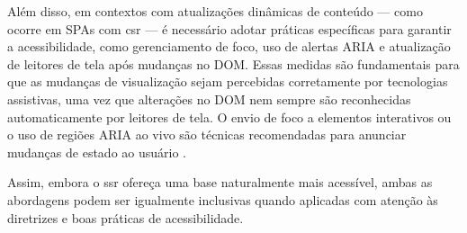 Além disso, em contextos com atualizações dinâmicas de conteúdo — como ocorre em SPAs com \acrshort{csr} — é necessário adotar práticas específicas para garantir a acessibilidade, como gerenciamento de foco, uso de alertas ARIA e atualização de leitores de tela após mudanças no DOM. Essas medidas são fundamentais para que as mudanças de visualização sejam percebidas corretamente por tecnologias assistivas, uma vez que alterações no DOM nem sempre são reconhecidas automaticamente por leitores de tela. O envio de foco a elementos interativos ou o uso de regiões ARIA ao vivo são técnicas recomendadas para anunciar mudanças de estado ao usuário \cite{sutton2018}.

Assim, embora o \acrshort{ssr} ofereça uma base naturalmente mais acessível, ambas as abordagens podem ser igualmente inclusivas quando aplicadas com atenção às diretrizes e boas práticas de acessibilidade.


